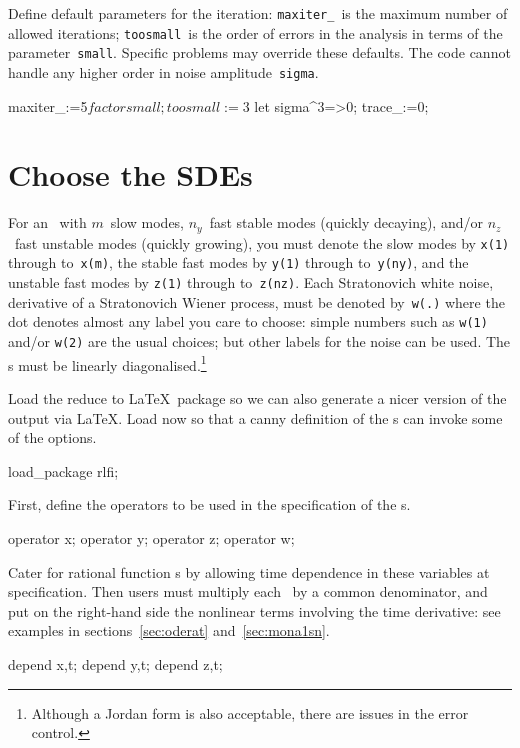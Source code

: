 \documentclass[11pt,a5paper]{article}
\begin{document}
Define default parameters for the iteration:
\verb|maxiter_|~is the maximum number of allowed iterations;
\verb|toosmall|~is the order of errors in the analysis in terms of the parameter~\verb|small|.
Specific problems may override these defaults.
The code cannot handle any higher order in noise amplitude~\verb|sigma|.
\begin{reduce}
maxiter_:=5$%
factor small; 
toosmall:=3$
let sigma^3=>0;
trace_:=0;
\end{reduce}




\section{Choose the SDEs}

For an \sde\ with $m$~slow modes, $n_y$~fast stable modes (quickly decaying), and/or \(n_z\)~fast unstable modes (quickly growing), you must denote the slow modes by \verb|x(1)| through to~\verb|x(m)|, the stable fast modes by \verb|y(1)| through to~\verb|y(ny)|, and the unstable fast modes by \verb|z(1)| through to~\verb|z(nz)|.
Each Stratonovich white noise, derivative of a Stratonovich Wiener process, must be denoted by~\verb|w(.)| where the dot denotes almost any label you care to choose: simple numbers such as \verb|w(1)| and/or \verb|w(2)| are the usual choices; but other labels for the noise can be used.
The \sde{}s must be linearly diagonalised.\footnote{Although a Jordan form is also acceptable, there are issues in the error control.}  

Load the reduce to \LaTeX\ package so we can also generate a nicer version of the output via \LaTeX.
Load now so that a canny definition of the \sde{}s can invoke some of the options.  
\begin{reduce}
load_package rlfi;
\end{reduce}

First, define the operators to be used in the specification of the \sde{}s.  
\begin{reduce}
operator x;
operator y;
operator z;
operator w;
\end{reduce}

Cater for rational function \sde{}s by allowing time dependence in these variables at specification.  
Then users must multiply each \sde\ by a common denominator, and put on the right-hand side the nonlinear terms involving the time derivative: see examples in sections~\ref{sec:oderat} and~\ref{sec:mona1sn}.
\begin{reduce}
depend x,t;
depend y,t;
depend z,t;
\end{reduce}
\end{document}
